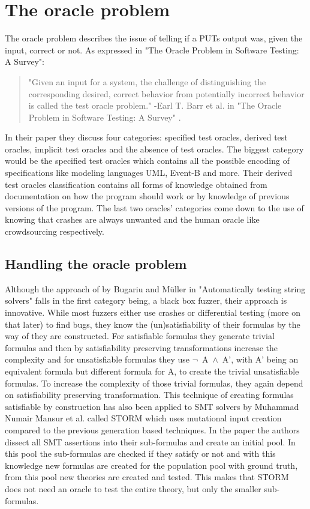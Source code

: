 \section{The oracle problem}
\label{cha:2:OracleProblem}
The oracle problem describes the issue of telling if a PUTs output was, given the input, correct or not. As expressed in "The Oracle Problem in Software Testing: A Survey": 
\begin{quote}
	"Given an input for a system, the challenge of distinguishing the corresponding desired, correct behavior from potentially incorrect behavior is called the test oracle problem."
	\newline
	-Earl T. Barr et al. in "The Oracle Problem in Software Testing: A Survey" \cite{10barr2014oracleProblem}.
\end{quote}
In their paper they discuss four categories: specified test oracles, derived test oracles, implicit test oracles and the absence of test oracles. The biggest category would be the specified test oracles which contains all the possible encoding of specifications like modeling languages UML, Event-B and more. Their derived test oracles classification contains all forms of knowledge obtained from documentation on how the program should work or by knowledge of previous versions of the program. The last two oracles' categories come down to the use of knowing that crashes are always unwanted and the human oracle like crowdsourcing respectively.

\subsection{Handling the oracle problem}
\label{cha:2:handelingOracelproblem}
Although the approach of by Bugariu and M\"uller in "Automatically testing string solvers" \cite{9bugariu2020automaticallyTestingStringSolvers} falls in the first category being, a black box fuzzer, their approach is innovative. While most fuzzers either use crashes or differential testing (more on that later) to find bugs, they know the (un)satisfiability of their formulas by the way of they are constructed. For satisfiable formulas they generate trivial formulas and then by satisfiability preserving transformations increase the complexity and for unsatisfiable formulas they use \mbox{$\neg$ A $\land$ A'}, with A' being an equivalent formula but different formula for A, to create the trivial unsatisfiable formulas. To increase the complexity of those trivial formulas, they again depend on satisfiability preserving transformation. This technique of creating formulas satisfiable by construction has also been applied to SMT solvers by Muhammad Numair Mansur et al. called STORM \cite{1mansur2020detecting} which uses mutational input creation compared to the previous generation based techniques. In the paper the authors dissect all SMT assertions into their sub-formulas and create an initial pool. In this pool the sub-formulas are checked if they satisfy or not and with this knowledge new formulas are created for the population pool with ground truth, from this pool new theories are created and tested. This makes that STORM does not need an oracle to test the entire theory, but only the smaller sub-formulas.


